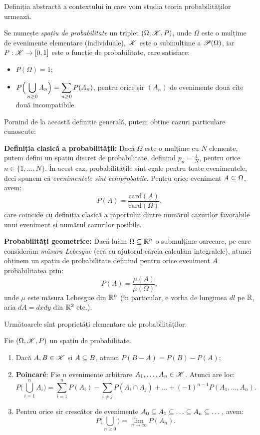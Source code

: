 Definiția abstractă a contextului în care vom studia teoria probabilităților urmează.

\begin{definition}\label{def:spatiu-prob}
  Se numește \emph{spațiu de probabilitate} un triplet $ (\Omega, \mathscr{K}, P) $, unde
  $ \Omega $ este o mulțime de evenimente elementare (individuale), $ \mathscr{K} $ este o
  submulțime a $ \mathscr{P}(\Omega) $, iar $ P : \mathscr{K} \to [0, 1] $ este o funcție de
  probabilitate, care satisface:
  \begin{itemize}
  \item $ P(\Omega) = 1 $;
  \item $ P \Big( \displaystyle\bigcup_{n \geq 0} A_n \Big) = \displaystyle\sum_{n \geq 0} P(A_n) $,
    pentru orice șir $ (A_n) $ de evenimente două cîte două incompatibile.
  \end{itemize}
\end{definition}

Pornind de la această definiție generală, putem obține cazuri particulare cunoscute:

\textbf{Definiția clasică a probabilității:} Dacă $ \Omega $ este o mulțime cu $ N $
elemente, putem defini un spațiu discret de probabilitate, definind $ p_n = \frac{1}{N} $,
pentru orice $ n \in \{ 1, \dots, N \}$. În acest caz, probabilitățile sînt egale pentru
toate evenimentele, deci spunem că \emph{evenimentele sînt echiprobabile}. Pentru orice
eveniment $ A \subseteq \Omega $, avem:
\[
  P(A) = \frac{\mathrm{card}(A)}{\mathrm{card}(\Omega)},
\]
care coincide cu definiția clasică a raportului dintre numărul cazurilor favorabile
unui eveniment și numărul cazurilor posibile.

\vspace{0.3cm}

\textbf{Probabilități geometrice:} Dacă luăm $ \Omega \subseteq \mathbb{R}^n $ o submulțime oarecare,
pe care considerăm \emph{măsura Lebesgue} (cea cu ajutorul căreia calculăm integralele),
atunci obținem un spațiu de probabilitate definind pentru orice eveniment $ A $
probabilitatea prin:
\[
  P(A) = \frac{\mu(A)}{\mu(\Omega)},
\]
unde $ \mu $ este măsura Lebesgue din $ \mathbb{R}^n $ (în particular, e vorba de lungimea $ dl $
pe $ \mathbb{R} $, aria $ dA = dxdy $ din $ \mathbb{R}^2 $ etc.).

\vspace{0.3cm}

Următoarele sînt proprietăți elementare ale probabilităților:

Fie $ (\Omega, \mathscr{K}, P) $ un spațiu de probabilitate.
\begin{enumerate}[(1)]
\item Dacă $ A, B \in \mathscr{K} $ și $ A \subseteq B $, atunci $ P(B - A) = P(B) - P(A) $;
\item \textbf{Poincar\'{e}}: Fie $ n $ evenimente arbitrare $ A_1, \dots, A_n \in \mathscr{K} $.
  Atunci are loc:
  \[
    P \Big( \bigcup_{i = 1}^n A_i \Big) = \sum_{i = 1}^n P(A_i) - \sum_{i \neq j} P(A_i \cap A_j) + %
    \dots + (-1)^{n-1} P(A_1, \dots, A_n).
  \]
\item Pentru orice șir crescător de evenimente $ A_0 \seq A_1 \seq \dots \seq A_n \seq \dots $,
  avem:
  \[
    P \Big( \bigcup_{n\geq 0} \Big) = \lim_{n \to \infty} P(A_n).
  \]
\end{enumerate}

